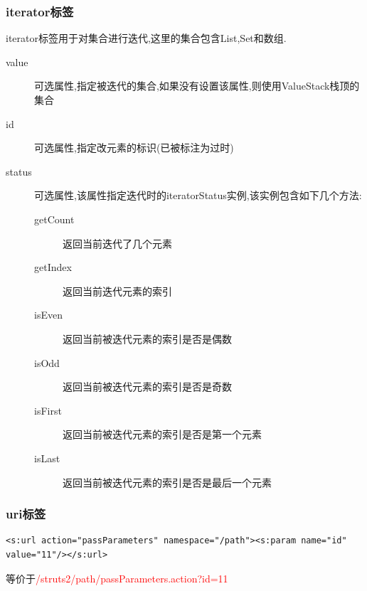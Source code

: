 \subsubsection{iterator标签}
iterator标签用于对集合进行迭代,这里的集合包含List,Set和数组.
\begin{description}
\item[value]		可选属性,指定被迭代的集合,如果没有设置该属性,则使用ValueStack栈顶的集合
\item[id]	可选属性,指定改元素的标识(已被标注为过时)
\item[status]	可选属性,该属性指定迭代时的iteratorStatus实例,该实例包含如下几个方法:
\begin{description}
\item[getCount]	返回当前迭代了几个元素
\item[getIndex]	返回当前迭代元素的索引
\item[isEven]	返回当前被迭代元素的索引是否是偶数
\item[isOdd]		返回当前被迭代元素的索引是否是奇数
\item[isFirst]	返回当前被迭代元素的索引是否是第一个元素
\item[isLast]	返回当前被迭代元素的索引是否是最后一个元素
\end{description}
\end{description}

\subsubsection{uri标签}
\begin{lstlisting}[style=JAVA]
<s:url action="passParameters" namespace="/path"><s:param name="id" value="11"/></s:url>
\end{lstlisting}
等价于\textcolor{red}{/struts2/path/passParameters.action?id=11}

